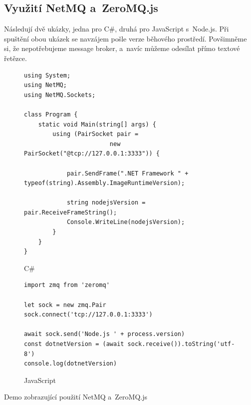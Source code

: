 \documentclass[12pt, a4paper, twoside]{article}
\newcommand{\codefigureSpacing}{1.2}
\begin{document}
   \subsection{Využití NetMQ a~ZeroMQ.js}
   \label{sub_sec:zeromqDemo}
    Následují dvě ukázky, jedna pro C\#, druhá pro JavaScript s~Node.js. Při spuštění obou ukázek se navzájem pošle verze běhového prostředí. Povšimněme si, že nepotřebujeme message broker, a~navíc můžeme odesílat přímo textové řetězce.
\begin{codefigure}[H]
\renewcommand\baselinestretch{\codefigureSpacing}
	\begin{subfigure}[t]{\textwidth}
	\begin{lstlisting}[style=MyCSharp]
using System;
using NetMQ;
using NetMQ.Sockets;

class Program {
	static void Main(string[] args)	{
		using (PairSocket pair = 
						new PairSocket("@tcp://127.0.0.1:3333")) {
							
			pair.SendFrame(".NET Framework " + typeof(string).Assembly.ImageRuntimeVersion);
			
			string nodejsVersion = pair.ReceiveFrameString();
			Console.WriteLine(nodejsVersion);
		}
	}	
}
	\end{lstlisting}
	\caption{C\#}
	\end{subfigure}
\end{codefigure}
   	\begin{codefigure}[H] \ContinuedFloat
   	\renewcommand\baselinestretch{\codefigureSpacing}
   		\begin{subfigure}[t]{\textwidth}
	   	\begin{lstlisting}[style=MyJavaScript]
import zmq from 'zeromq'

let sock = new zmq.Pair
sock.connect('tcp://127.0.0.1:3333')

await sock.send('Node.js ' + process.version)
const dotnetVersion = (await sock.receive()).toString('utf-8')
console.log(dotnetVersion)
       \end{lstlisting}
   \caption{JavaScript}
   \end{subfigure}
	\caption{Demo zobrazující použití NetMQ a~ZeroMQ.js}
   	\end{codefigure}
	\setcounter{secnumdepth}{-2}
	\glsaddallunused
	\pagebreak
	\printglossary[title=Slovníček vybraných pojmů, toctitle=Slovníček vybraných pojmů]
	\label{glossary}
	\newpage
	
	\sectionfont{}
	\listoffigures
	\pagebreak
	\listoftables
	\pagebreak
	\listofcodefigures
	
	
	
	
\end{document}
